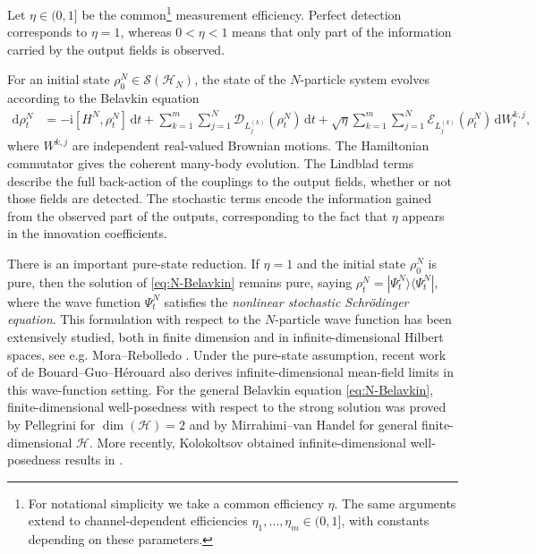 \documentclass[10pt,a4paper,reqno]{amsart}
\numberwithin{equation}{section}
\theoremstyle{plain}
\theoremstyle{definition}
\theoremstyle{remark}
\renewcommand{\d}{\mathrm d}
\renewcommand{\i}{\mathrm i}
\newcommand{\cS}{\mathcal S}
\newcommand{\cD}{\mathcal D}
\newcommand{\cE}{\mathcal E}
\newcommand{\HH}{\mathcal H}
\newcommand{\1}{\mathbf 1}
\begin{document}
\medskip

Let \(\eta\in(0,1]\) be the common\footnote{For notational simplicity we take a common efficiency \(\eta\).  The same
arguments extend to channel-dependent efficiencies
\(\eta_1,\ldots,\eta_m\in(0,1]\), with constants depending on these parameters.} measurement efficiency.   Perfect detection
corresponds to \(\eta=1\), whereas \(0<\eta<1\) means that only part of the
information carried by the output fields is observed. 

\medskip 

For an initial state $\rho_0^N\in\cS(\HH_N)$, the state of the \(N\)-particle system evolves according to 
the Belavkin equation
\begin{equation}
\begin{aligned}
  \d\rho_t^N
  &=
  -\i[H^N,\rho_t^N]\,\d t
  +
  \sum_{k=1}^m\sum_{j=1}^N
  \cD_{L_j^{(k)}}(\rho_t^N)\,\d t
 +
  \sqrt{\eta}
  \sum_{k=1}^m\sum_{j=1}^N
  \cE_{L_j^{(k)}}(\rho_t^N)\,\d W_t^{k,j},
\end{aligned}
  \label{eq:N-Belavkin}
\end{equation}
where $W^{k,j}$ are independent real-valued Brownian motions.  The Hamiltonian commutator gives the coherent many-body evolution.  The
Lindblad terms describe the full back-action of the couplings to the output
fields, whether or not those fields are detected.  The stochastic terms encode
the information gained from the observed part of the outputs,  corresponding to the fact that 
$\eta$ appears in the innovation coefficients.  

\medskip

There is an important pure-state reduction.  If \(\eta=1\) and the initial
state $\rho^N_0$ is pure, then the solution of \eqref{eq:N-Belavkin} remains pure,  saying  \(\rho_t^N=|\Psi_t^N\rangle\langle\Psi_t^N|\),  where the wave function
\(\Psi_t^N\) satisfies the \emph{nonlinear stochastic Schr\"odinger equation}.
This formulation with respect to the  \(N\)-particle wave function  has been extensively studied, both in finite
dimension and in infinite-dimensional Hilbert spaces,  see e.g. Mora--Rebolledo \cite{mora2008}.  Under the pure-state assumption, recent work of de Bouard--Guo--H\'erouard
\cite{bouard2026} also derives infinite-dimensional mean-field limits in this
wave-function setting.  For  the general Belavkin equation \eqref{eq:N-Belavkin},  finite-dimensional well-posedness with respect to the strong solution  was proved by Pellegrini \cite{pellegrini2008}  for
\(\dim(\HH)=2\) and by Mirrahimi--van Handel
\cite{mirrahimivanhandel2007}  for general
finite-dimensional \(\HH\).  More recently,  Kolokoltsov obtained
infinite-dimensional well-posedness results in
\citep{kolokoltsov2025a,kolokoltsov2025b}.
\end{document}
